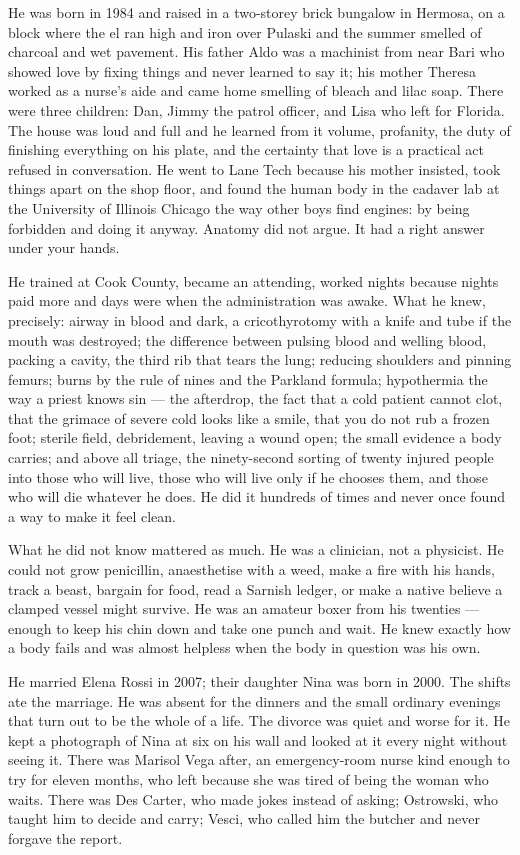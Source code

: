 \documentclass{design/chronicle}
\begin{document}
{
He was born in 1984 and raised in a two-storey brick bungalow in Hermosa, on a block where the el ran high and iron over Pulaski and the summer smelled of charcoal and wet pavement. His father Aldo was a machinist from near Bari who showed love by fixing things and never learned to say it; his mother Theresa worked as a nurse’s aide and came home smelling of bleach and lilac soap. There were three children: Dan, Jimmy the patrol officer, and Lisa who left for Florida. The house was loud and full and he learned from it volume, profanity, the duty of finishing everything on his plate, and the certainty that love is a practical act refused in conversation. He went to Lane Tech because his mother insisted, took things apart on the shop floor, and found the human body in the cadaver lab at the University of Illinois Chicago the way other boys find engines: by being forbidden and doing it anyway. Anatomy did not argue. It had a right answer under your hands.

He trained at Cook County, became an attending, worked nights because nights paid more and days were when the administration was awake. What he knew, precisely: airway in blood and dark, a cricothyrotomy with a knife and tube if the mouth was destroyed; the difference between pulsing blood and welling blood, packing a cavity, the third rib that tears the lung; reducing shoulders and pinning femurs; burns by the rule of nines and the Parkland formula; hypothermia the way a priest knows sin — the afterdrop, the fact that a cold patient cannot clot, that the grimace of severe cold looks like a smile, that you do not rub a frozen foot; sterile field, debridement, leaving a wound open; the small evidence a body carries; and above all triage, the ninety-second sorting of twenty injured people into those who will live, those who will live only if he chooses them, and those who will die whatever he does. He did it hundreds of times and never once found a way to make it feel clean.

What he did not know mattered as much. He was a clinician, not a physicist. He could not grow penicillin, anaesthetise with a weed, make a fire with his hands, track a beast, bargain for food, read a Sarnish ledger, or make a native believe a clamped vessel might survive. He was an amateur boxer from his twenties — enough to keep his chin down and take one punch and wait. He knew exactly how a body fails and was almost helpless when the body in question was his own.

He married Elena Rossi in 2007; their daughter Nina was born in 2000. The shifts ate the marriage. He was absent for the dinners and the small ordinary evenings that turn out to be the whole of a life. The divorce was quiet and worse for it. He kept a photograph of Nina at six on his wall and looked at it every night without seeing it. There was Marisol Vega after, an emergency-room nurse kind enough to try for eleven months, who left because she was tired of being the woman who waits. There was Des Carter, who made jokes instead of asking; Ostrowski, who taught him to decide and carry; Vesci, who called him the butcher and never forgave the report.

}
\end{document}
